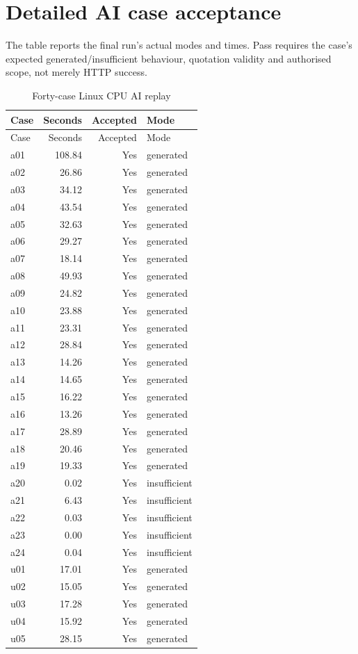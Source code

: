 \documentclass[11pt,a4paper,oneside]{report}
\begin{document}
\section{Detailed AI case acceptance}
The table reports the final run's actual modes and times. Pass requires the case's expected generated/insufficient behaviour, quotation validity and authorised scope, not merely HTTP success.
\begin{longtable}{lrrl}\caption{Forty-case Linux CPU AI replay}\\\toprule Case&Seconds&Accepted&Mode\\\midrule\endfirsthead\toprule Case&Seconds&Accepted&Mode\\\midrule\endhead
a01&108.84&Yes&generated\\
a02&26.86&Yes&generated\\
a03&34.12&Yes&generated\\
a04&43.54&Yes&generated\\
a05&32.63&Yes&generated\\
a06&29.27&Yes&generated\\
a07&18.14&Yes&generated\\
a08&49.93&Yes&generated\\
a09&24.82&Yes&generated\\
a10&23.88&Yes&generated\\
a11&23.31&Yes&generated\\
a12&28.84&Yes&generated\\
a13&14.26&Yes&generated\\
a14&14.65&Yes&generated\\
a15&16.22&Yes&generated\\
a16&13.26&Yes&generated\\
a17&28.89&Yes&generated\\
a18&20.46&Yes&generated\\
a19&19.33&Yes&generated\\
a20&0.02&Yes&insufficient\\
a21&6.43&Yes&insufficient\\
a22&0.03&Yes&insufficient\\
a23&0.00&Yes&insufficient\\
a24&0.04&Yes&insufficient\\
u01&17.01&Yes&generated\\
u02&15.05&Yes&generated\\
u03&17.28&Yes&generated\\
u04&15.92&Yes&generated\\
u05&28.15&Yes&generated\\

\end{longtable}
\end{document}
